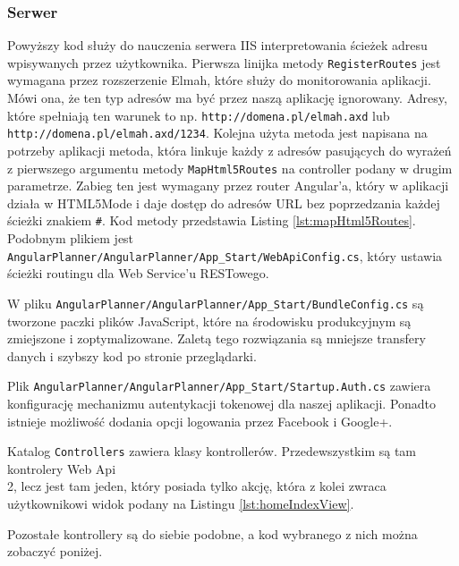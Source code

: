 \documentclass[10pt,titlepage]{article}
\begin{document}
\subsubsection{Serwer}
\lstset{style=sharpc}

\par Powyższy kod służy do nauczenia serwera IIS interpretowania ścieżek adresu wpisywanych przez użytkownika. Pierwsza linijka metody \verb|RegisterRoutes| jest wymagana przez rozszerzenie Elmah, które służy do monitorowania aplikacji. Mówi ona, że ten typ adresów ma być przez naszą aplikację ignorowany. Adresy, które spełniają ten warunek to np. \verb|http://domena.pl/elmah.axd| lub \verb|http://domena.pl/elmah.axd/1234|. Kolejna użyta metoda jest napisana na potrzeby aplikacji metoda, która linkuje każdy z adresów pasujących do wyrażeń z pierwszego argumentu metody \verb|MapHtml5Routes| na controller podany w drugim parametrze. Zabieg ten jest wymagany przez router Angular'a, który w aplikacji działa w HTML5Mode i daje dostęp do adresów URL bez poprzedzania każdej ścieżki znakiem \verb|#|. Kod metody przedstawia Listing \ref{lst:mapHtml5Routes}. Podobnym plikiem jest \verb|AngularPlanner/AngularPlanner/App_Start/WebApiConfig.cs|, który ustawia ścieżki routingu dla Web Service'u RESTowego.

\par W pliku \verb|AngularPlanner/AngularPlanner/App_Start/BundleConfig.cs| są tworzone paczki plików JavaScript, które na środowisku produkcyjnym są zmiejszone i zoptymalizowane. Zaletą tego rozwiązania są mniejsze transfery danych i szybszy kod po stronie przeglądarki.\par Plik \verb|AngularPlanner/AngularPlanner/App_Start/Startup.Auth.cs| zawiera konfigurację mechanizmu autentykacji tokenowej dla naszej aplikacji. Ponadto istnieje możliwość dodania opcji logowania przez Facebook i Google+.\par Katalog \verb|Controllers| zawiera klasy kontrollerów. Przedewszystkim są tam kontrolery Web Api\\ 2, lecz jest tam jeden, który posiada tylko akcję, która z kolei zwraca użytkownikowi widok podany na Listingu \ref{lst:homeIndexView}.

\par Pozostałe kontrollery są do siebie podobne, a kod wybranego z nich można zobaczyć poniżej.
\end{document}
